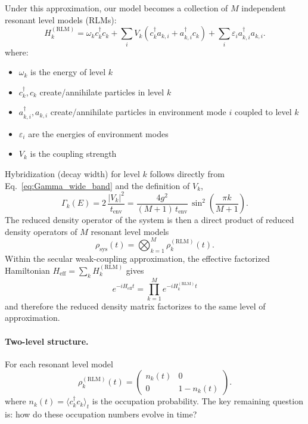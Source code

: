 \documentclass[12pt,oneside,openright]{report}
\theoremstyle{definition}
\theoremstyle{plain}
\theoremstyle{remark}
\begin{document}
Under this approximation, our model becomes a collection of $M$ independent resonant level models (RLMs):
\begin{equation}
H_k^{(\text{RLM})} = \omega_k c_k^\dagger c_k + \sum_i V_k \left(c_k^\dagger a_{k,i} + a_{k,i}^\dagger c_k\right) + \sum_i \varepsilon_i a_{k,i}^\dagger a_{k,i}.
\label{eq:RLM_hamiltonian}
\end{equation}
where:
\begin{itemize}
\item $\omega_k$ is the energy of level $k$
\item $c_k^\dagger, c_k$ create/annihilate particles in level $k$
\item $a_{k,i}^\dagger, a_{k,i}$ create/annihilate particles in environment mode $i$ coupled to level $k$
\item $\varepsilon_i$ are the energies of environment modes
\item $V_k$ is the coupling strength
\end{itemize}
Hybridization (decay width) for level $k$ follows directly from Eq.~\eqref{eq:Gamma_wide_band} and the definition of $V_k$,
\begin{equation}
\Gamma_k(E) = 2\,\frac{|V_k|^2}{t_{\text{env}}}
= \frac{4 g^2}{(M+1)\, t_{\text{env}}}\, \sin^2\!\left(\frac{\pi k}{M+1}\right).
\label{eq:Gamma_k}
\end{equation}
The reduced density operator of the system is then a direct product of reduced density operators of $M$ resonant level models
\begin{equation}
\rho_{\text{sys}}(t) = \bigotimes_{k=1}^M \rho_k^{(\text{RLM})}(t).
\label{eq:rho_sys_factorized}
\end{equation}
Within the secular weak-coupling approximation, the effective factorized Hamiltonian \(H_{\mathrm{eff}}=\sum_k H_k^{(\mathrm{RLM})}\) gives
\begin{equation}
e^{-iH_{\mathrm{eff}}t} = \prod_{k=1}^M e^{-iH_k^{(\text{RLM})}t}
\end{equation}
and therefore the reduced density matrix factorizes to the same level of approximation.
\paragraph{Two-level structure.}
For each resonant level model
\begin{equation}
\rho_k^{(\text{RLM})}(t) = \begin{pmatrix}
n_k(t) & 0 \\
0 & 1-n_k(t)
\end{pmatrix}.
\label{eq:rho_k_form}
\end{equation}
where $n_k(t) = \langle c_k^\dagger c_k \rangle_t$ is the occupation probability.
The key remaining question is: how do these occupation numbers evolve in time?
\end{document}
